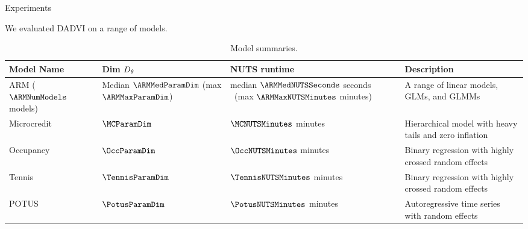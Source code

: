 \documentclass[8pt]{beamer}\usepackage[]{graphicx}\usepackage[]{color}
\begin{document}


\begin{frame}{Experiments}

    We evaluated DADVI on a range of models.
    
    \begin{table}[h!]
        \begin{tabular}{|x{0.15\textwidth}|x{0.13\textwidth}|x{0.25\textwidth}|x{0.3\textwidth}|}
        \hline\hline
        Model Name  & Dim ${D_{\theta}}$     & NUTS runtime & Description \\
        \hline\hline
        ARM  \newline ($\ARMNumModels$ models) &
        Median $\ARMMedParamDim$ 
            \newline(max $\ARMMaxParamDim$)&
        median $\ARMMedNUTSSeconds$ seconds \
            \newline(max $\ARMMaxNUTSMinutes$ minutes) 
            &
           A range of linear models, GLMs, and GLMMs \\
        \hline
        Microcredit & $\MCParamDim$ & $\MCNUTSMinutes$ minutes &
           Hierarchical model with heavy tails and zero inflation \\
        \hline
        Occupancy & $\OccParamDim$ & $\OccNUTSMinutes$ minutes &
           Binary regression with highly crossed random effects \\
        \hline
        Tennis & $\TennisParamDim$ & $\TennisNUTSMinutes$ minutes &
           Binary regression with highly crossed random effects \\
        \hline
        POTUS & $\PotusParamDim$ & $\PotusNUTSMinutes$ minutes &
            Autoregressive time series with random effects \\
        \hline\hline
        \end{tabular}
        \caption{Model summaries.}
        \label{tab:model_desc}
    \end{table}
        
\end{frame}

\end{document}
